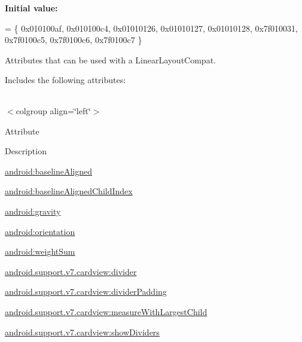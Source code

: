 {\bfseries Initial value\+:}
\begin{DoxyCode}
= \{
            0x010100af, 0x010100c4, 0x01010126, 0x01010127,
            0x01010128, 0x7f010031, 0x7f0100c5, 0x7f0100c6,
            0x7f0100c7
        \}
\end{DoxyCode}
Attributes that can be used with a Linear\+Layout\+Compat. 

Includes the following attributes\+:

\tabulinesep=1mm
\begin{longtabu} spread 0pt [c]{*{0}{|X[-1]}|}
\hline
\end{longtabu}
$<$colgroup align=\char`\"{}left\char`\"{}$>$ 

Attribute

Description 

{\ttfamily \hyperlink{classandroid_1_1support_1_1v7_1_1cardview_1_1R_1_1styleable_ae586b23df4ea32887555ce78f3325c2c}{android\+:baseline\+Aligned}}

{\ttfamily \hyperlink{classandroid_1_1support_1_1v7_1_1cardview_1_1R_1_1styleable_a4d14d09d5046c55861bd2bec052dadc6}{android\+:baseline\+Aligned\+Child\+Index}}

{\ttfamily \hyperlink{classandroid_1_1support_1_1v7_1_1cardview_1_1R_1_1styleable_a79860f1d2dcf6184afd98a5a4c05c4d3}{android\+:gravity}}

{\ttfamily \hyperlink{classandroid_1_1support_1_1v7_1_1cardview_1_1R_1_1styleable_a14c04fc78fe9e84448ae5d48136d1863}{android\+:orientation}}

{\ttfamily \hyperlink{classandroid_1_1support_1_1v7_1_1cardview_1_1R_1_1styleable_acc1a68c6378bbcabe87187876d00b531}{android\+:weight\+Sum}}

{\ttfamily \hyperlink{classandroid_1_1support_1_1v7_1_1cardview_1_1R_1_1styleable_ae493358d79f8ffabc299fa9e157f0537}{android.\+support.\+v7.\+cardview\+:divider}}

{\ttfamily \hyperlink{classandroid_1_1support_1_1v7_1_1cardview_1_1R_1_1styleable_adab5ae000e1bad33383cace0ae37b88f}{android.\+support.\+v7.\+cardview\+:divider\+Padding}}

{\ttfamily \hyperlink{classandroid_1_1support_1_1v7_1_1cardview_1_1R_1_1styleable_a23dc8b1f6679ad6ed9cc4175980386da}{android.\+support.\+v7.\+cardview\+:measure\+With\+Largest\+Child}}

{\ttfamily \hyperlink{classandroid_1_1support_1_1v7_1_1cardview_1_1R_1_1styleable_a283ec7224bcb5e6c731bcef2e91802f0}{android.\+support.\+v7.\+cardview\+:show\+Dividers}}

